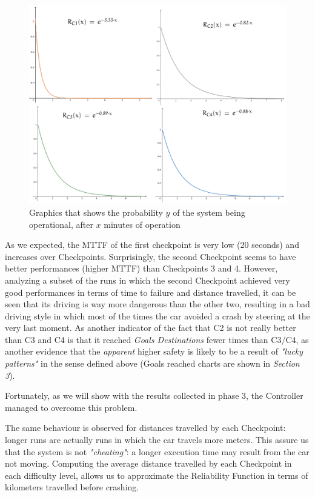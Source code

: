 \begin{figure}[h!]
	\includegraphics[width=\textwidth]{img/reliability-comparison.png}
	\caption{Graphics that shows the probability $y$ of the system being operational, after $x$ minutes of operation}
\end{figure}

As we expected, the MTTF of the first checkpoint is very low (20 seconds) and increases over Checkpoints. Surprisingly, the second Checkpoint seems to have better performances (higher MTTF) than Checkpoints 3 and 4. However, analyzing a subset of the runs in which the second Checkpoint achieved very good performances in terms of time to failure and distance travelled, it can be seen that its driving is way more dangerous than the other two, resulting in a bad driving style in which most of the times the car avoided a crash by steering at the very last moment. As another indicator of the fact that C2 is not really better than C3 and C4 is that it reached \textsl{Goals Destinations} fewer times than C3/C4, as another evidence that the \textsl{apparent} higher safety is likely to be a result of \textsl{"lucky patterns"} in the sense defined above (Goals reached charts are shown in \textsl{Section 3}).

Fortunately, as we will show with the results collected in phase 3, the Controller managed to overcome this problem.\newline

The same behaviour is observed for distances travelled by each Checkpoint: longer runs are actually runs in which the car travels more meters. This assure us that the system is not \textsl{"cheating"}: a longer execution time may result from the car not moving. Computing the average distance travelled by each Checkpoint in each difficulty level, allows us to approximate the Reliability Function in terms of kilometers travelled before crashing.

